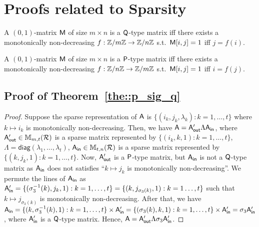 
\section{Proofs related to Sparsity}
\label{sec:matrix_found_sparse}


\begin{definition}
\label{q_type}
A $(0,1)$-matrix $\mathsf{M}$ of size $m\times n$ is a $\mathsf{Q}$-type matrix iff there exists a monotonically non-decreasing %
$f:\mathbb{Z}/m\mathbb{Z}\rightarrow \mathbb{Z}/n\mathbb{Z}$ s.t.~$\mathsf{M}[i,j]=1$ iff $j=f(i)$.
\end{definition}

\begin{definition} 
\label{p_type}
A $(0,1)$-matrix $\mathsf{M}$ of size $m\times n$ is a $\mathsf{P}$-type matrix iff there exists a monotonically non-decreasing %
$f:\mathbb{Z}/n\mathbb{Z}\rightarrow \mathbb{Z}/m\mathbb{Z}$ s.t.~$\mathsf{M}[i,j]=1$ iff $i=f(j)$.
\end{definition}

\subsection{Proof of Theorem~\ref{the::p_sig_q}}
\label{sec::proof_p_sig_q}
\begin{proof}
Suppose the sparse representation of $\mathsf{A}$ is $\{(i_k, j_k, \lambda_k): k=1, \ldots, t\}$ where
$k \mapsto i_k$ is monotonically non-decreasing.
Then, we have $\mathsf{A}=\mathsf{A}_{\mathsf{out}}'\Lambda \mathsf{A}_{\mathsf{in}}$, where $\mathsf{A}_{\mathsf{out}}'\in \mathbb{M}_{m,t}(\mathcal{R})$ is a sparse matrix represented by $\{(i_k, k, 1): k=1, \ldots, t\}$, $\Lambda=\mathsf{diag}(\lambda _1, \ldots, \lambda _t)$, $\mathsf{A}_{\mathsf{in}}\in \mathbb{M}_{t,n}(\mathcal{R})$ is a 
sparse matrix represented by $\{(k, j_k, 1): k=1, \ldots, t\}$.
Now, $\mathsf{A}_{\mathsf{out}}'$ is a $\mathsf{P}$-type matrix, but $\mathsf{A}_{\mathsf{in}}$ is not a $\mathsf{Q}$-type matrix as $\mathsf{A}_{\mathsf{in}}$ does not satisfies ``$k \mapsto j_k$ is monotonically non-decreasing''.
We permute the lines of $\mathsf{A}_{\mathsf{in}}$ as $\mathsf{A}_{\mathsf{in}}'=\{ (\sigma_3^{-1}(k), j_k, 1): k=1, \ldots, t\}=\{ (k, j_{\sigma_3(k)}, 1): k=1\ldots, t\}$ such that $k \mapsto j_{\sigma _3(k)}$ is monotonically non-decreasing.
After that, we have $\mathsf{A}_{\mathsf{in}}= \{ (k, \sigma_3^{-1}(k), 1): k=1, \ldots, t \} \times \mathsf{A}_{\mathsf{in}}' = \{ (\sigma_3(k), k, 1): k=1, \ldots, t \} \times \mathsf{A}_{\mathsf{in}}' =\sigma_3 \mathsf{A}_{\mathsf{in}}'$, where $\mathsf{A}_{\mathsf{in}}'$ is a $\mathsf{Q}$-type matrix.
Hence, $\mathsf{A}=\mathsf{A}_{\mathsf{out}}' \Lambda \sigma _3 \mathsf{A}_{\mathsf{in}}'$.
\end{proof}

